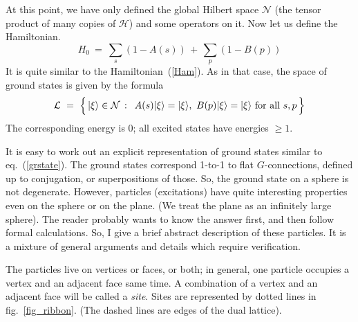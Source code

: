 \documentclass[12pt]{article}
\newcommand{\calH}{\mathcal{H}}
\newcommand{\calL}{\mathcal{L}}
\newcommand{\calN}{\mathcal{N}}
\begin{document}
At this point, we have only defined the global Hilbert space $\calN$ 
(the tensor product of many copies of $\calH$) and some operators on it. 
Now let us define the Hamiltonian.
\begin{equation} \label{Ham1}
  H_0\ =\ \sum_s (1-A(s)) \,+\, \sum_p (1-B(p))
\end{equation}
It is quite similar to the Hamiltonian~(\ref{Ham}). As in that case, the
space of ground states is given by the formula
\begin{equation} \label{grspace}
  \calL\ =\ \Bigl\{\, |\xi\rangle\in\calN\,:\,\  
  A(s)|\xi\rangle=|\xi\rangle,\ B(p)|\xi\rangle=|\xi\rangle\ 
  \mbox{for all}\ s,p  \,\Bigr\}
\end{equation}
The corresponding energy is $0$; all excited states have energies $\ge 1$.

It is easy to work out an explicit representation of ground states similar to
eq.~(\ref{grstate}). The ground states correspond 1-to-1 to flat
$G$-connections, defined up to conjugation, or superpositions of those. So,
the ground state on a sphere is not degenerate. However, particles
(excitations) have quite interesting properties even on the sphere or on the
plane. (We treat the plane as an infinitely large sphere). The reader probably
wants to know the answer first, and then follow formal calculations. So, I
give a brief abstract description of these particles. It is a mixture of
general arguments and details which require verification.

The particles live on vertices or faces, or both; in general, one particle
occupies a vertex and an adjacent face same time. A combination of a vertex
and an adjacent face will be called a \emph{site}. Sites are represented by
dotted lines in fig.~\ref{fig_ribbon}. (The dashed lines are edges of the dual
lattice).
\end{document}
